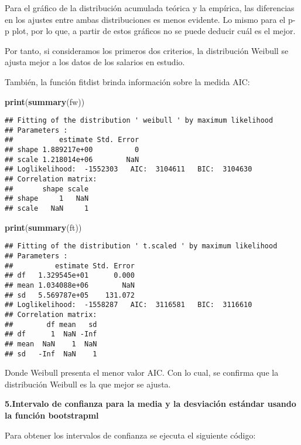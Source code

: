 \documentclass[
]{article}
\newenvironment{Shaded}{\begin{snugshade}}{\end{snugshade}}
\newcommand{\FunctionTok}[1]{\textcolor[rgb]{0.13,0.29,0.53}{\textbf{#1}}}
\newcommand{\NormalTok}[1]{#1}
\begin{document}
Para el gráfico de la distribución acumulada teórica y la empírica, las
diferencias en los ajustes entre ambas distribuciones es menos evidente.
Lo mismo para el p-p plot, por lo que, a partir de estos gráficos no se
puede deducir cuál es el mejor.

Por tanto, si consideramos los primeros dos criterios, la distribución
Weibull se ajusta mejor a los datos de los salarios en estudio.

También, la función fitdist brinda información sobre la medida AIC:

\begin{Shaded}
\begin{Highlighting}[]
\FunctionTok{print}\NormalTok{(}\FunctionTok{summary}\NormalTok{(fw))}
\end{Highlighting}
\end{Shaded}

\begin{verbatim}
## Fitting of the distribution ' weibull ' by maximum likelihood 
## Parameters : 
##           estimate Std. Error
## shape 1.889217e+00          0
## scale 1.218014e+06        NaN
## Loglikelihood:  -1552303   AIC:  3104611   BIC:  3104630 
## Correlation matrix:
##       shape scale
## shape     1   NaN
## scale   NaN     1
\end{verbatim}

\begin{Shaded}
\begin{Highlighting}[]
\FunctionTok{print}\NormalTok{(}\FunctionTok{summary}\NormalTok{(ft))}
\end{Highlighting}
\end{Shaded}

\begin{verbatim}
## Fitting of the distribution ' t.scaled ' by maximum likelihood 
## Parameters : 
##          estimate Std. Error
## df   1.329545e+01      0.000
## mean 1.034088e+06        NaN
## sd   5.569787e+05    131.072
## Loglikelihood:  -1558287   AIC:  3116581   BIC:  3116610 
## Correlation matrix:
##        df mean   sd
## df      1  NaN -Inf
## mean  NaN    1  NaN
## sd   -Inf  NaN    1
\end{verbatim}

Donde Weibull presenta el menor valor AIC. Con lo cual, se confirma que
la distribución Weibull es la que mejor se ajusta.

\textbf{5.Intervalo de confianza para la media y la desviación estándar
usando la función bootstrapml}

Para obtener los intervalos de confianza se ejecuta el siguiente código:
\end{document}
